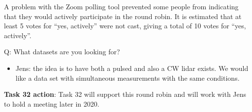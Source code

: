 A problem with the Zoom polling tool prevented some people from indicating that they would actively participate in the round robin. It is estimated that at least 5 votes for \enquote{yes, actively} were not cast, giving a total of 10 votes for \enquote{yes, actively}.

Q: What datasets are you looking for?

\begin{itemize}
\item Jens: the idea is to have both a pulsed and also a CW lidar exists. We would like a data set with simultaneous measurements with the same conditions.
\end{itemize}

\begin{taskactions}
\textbf{Task 32 action}: Task 32 will support this round robin and will work with Jens to hold a meeting later in 2020.
\end{taskactions}
